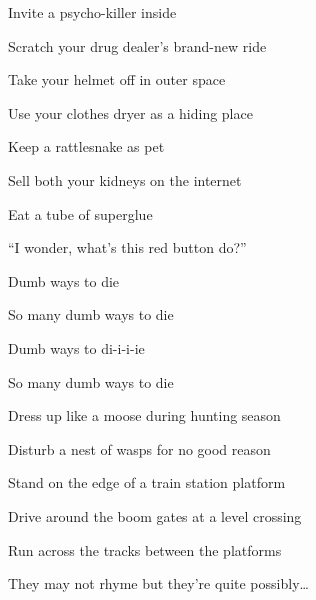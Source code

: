 \begin{song}
\bigskip

\Chorus

\bigskip

Invite a psycho-killer inside  \par
Scratch your drug dealer’s brand-new ride  \par
Take your helmet off in outer space \par
Use your clothes dryer as a hiding place \par

\bigskip

\Chorus

\bigskip

Keep a rattlesnake as pet  \par
Sell both your kidneys on the internet  \par
{}Eat a tube of superglue \par
{}``I wonder, what’s this red button do?'' \par

\bigskip

Dumb ways to die  \par
So many dumb ways to die  \par
{}Dumb ways to di-i-i-ie \par
So many dumb ways to die \par

\bigskip

 \par
{}Dress up like a moose during hunting season  \par
Disturb a nest of wasps for no good reason \par

\bigskip

 \par
{}Stand on the edge of a train station platform \par
{}Drive around the boom gates at a level crossing \par
{}Run across the tracks between the platforms  \par
They may not rhyme but they’re quite possibly… \par


\end{song}
